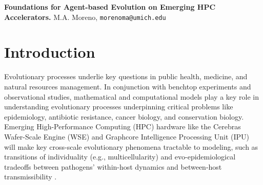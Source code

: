 

\noindent
\textbf{Foundations for Agent-based Evolution on Emerging HPC Accelerators.}
M.A. Moreno, \texttt{morenoma@umich.edu}

\section{Introduction}
Evolutionary processes underlie key questions in public health, medicine, and natural resources management.
In conjunction with benchtop experiments and observational studies, mathematical and computational models play a key role in understanding evolutionary processes underpinning critical problems like epidemiology, antibiotic resistance, cancer biology, and conservation biology.
Emerging High-Performance Computing (HPC) hardware like the Cerebras Wafer-Scale Engine (WSE) and Graphcore Intelligence Processing Unit (IPU) will make key cross-scale evolutionary phenomena tractable to modeling, such as transitions of individuality (e.g., multicellularity) and evo-epidemiological tradeoffs between pathogens' within-host dynamics and between-host transmissibility \cite{goldsby2020major,schreiber2021evolutionary}.

